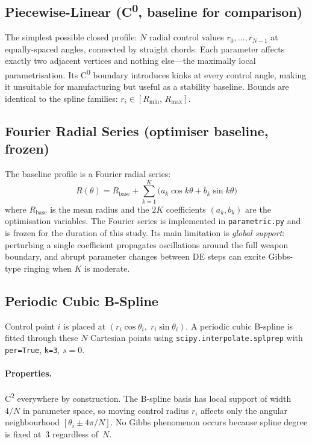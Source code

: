 \documentclass[10pt,twocolumn]{article}
\begin{document}
\subsection{Piecewise-Linear (C\textsuperscript{0}, baseline for comparison)}
\label{sec:pwlinear}

The simplest possible closed profile: $N$ radial control values
$r_0,\ldots,r_{N-1}$ at equally-spaced angles, connected by straight chords.
Each parameter affects exactly two adjacent vertices and nothing else---the
maximally local parametrisation.  Its C\textsuperscript{0} boundary
introduces kinks at every control angle, making it unsuitable for
manufacturing but useful as a stability baseline.  Bounds are identical to the
spline families: $r_i \in [R_{\min},\,R_{\max}]$.

\subsection{Fourier Radial Series (optimiser baseline, frozen)}
\label{sec:fourier}

The baseline profile is a Fourier radial series:
\begin{equation}
  R(\theta) = R_{\mathrm{base}}
    + \sum_{k=1}^{K}\bigl(a_k \cos k\theta + b_k \sin k\theta\bigr)
  \label{eq:fourier}
\end{equation}
where $R_{\mathrm{base}}$ is the mean radius and the $2K$ coefficients
$(a_k, b_k)$ are the optimisation variables.  The Fourier series is
implemented in \texttt{parametric.py} and is frozen for the duration of this
study.  Its main limitation is \emph{global support}: perturbing a single
coefficient propagates oscillations around the full weapon boundary, and
abrupt parameter changes between DE steps can excite Gibbs-type ringing
when $K$ is moderate.

\subsection{Periodic Cubic B-Spline}
\label{sec:bspline}

Control point $i$ is placed at
$(r_i \cos\theta_i,\; r_i \sin\theta_i)$.
A periodic cubic B-spline is fitted through these $N$ Cartesian points
using \texttt{scipy.interpolate.splprep} with \texttt{per=True}, \texttt{k=3},
$s{=}0$.

\paragraph{Properties.}
C\textsuperscript{2} everywhere by construction.  The B-spline basis has local
support of width $4/N$ in parameter space, so moving control radius $r_i$
affects only the angular neighbourhood $[\theta_i \pm 4\pi/N]$.  No Gibbs
phenomenon occurs because spline degree is fixed at~3 regardless of~$N$.
\end{document}

